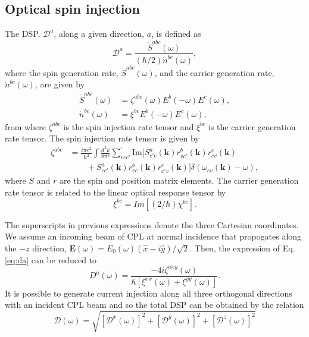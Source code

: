 \documentclass[pss]{wiley2sp} %
\begin{document}
\subsection{Optical spin injection}\label{sec:theory-DSP}

The DSP, $\mathcal{D}^{a}$, along a given direction, $a$, is defined as
\begin{equation}\label{eq:da}
\mathcal{D}^{a}=\frac{\dot{S}^{abc}(\omega)}{(\hbar/2)\dot{n}^{bc}(\omega)},
\end{equation}
where the spin generation rate, $\dot{S}^{abc}(\omega)$, and the carrier generation rate, $\dot{n}^{bc}(\omega)$,  are given by 
\begin{align*}
\dot{S}^{abc}(\omega) &= \zeta^{abc}(\omega)E^{b}(-\omega)E^{c}(\omega), \nonumber \\ 
\dot{n}^{bc}(\omega)  &= \xi^{bc}E^{b}(-\omega)E^{c}(\omega),
\end{align*}
from where $\zeta^{abc}$ is the spin injection rate tensor and $\xi^{bc}$ is the carrier generation rate tensor. The spin injection rate tensor is given by
\begin{align*}\label{eq:zeta}
\zeta^{abc} &= \frac{i\pi e^{2}}{\hbar^{2}}\int\frac{d^{3}k}{8\pi^{3}}
\sum_{vcc'}^{\prime}\text{Im}\bigl[S^{a}_{c'c}(\textbf{k})
r^{b}_{vc'}(\textbf{k})r^{c}_{cv}(\textbf{k})\nonumber\\
&\qquad+S^{a}_{cc'}(\textbf{k})
r^{b}_{vc}(\textbf{k})r^{c}_{c'v}(\textbf{k})\bigr]
\delta(\omega_{cv}(\textbf{k})-\omega),
\end{align*}
where $S$ and $r$ are the spin and position matrix elements. The carrier generation rate tensor is related to the linear optical response tensor by 
\begin{equation*}
\xi^{bc}=Im[(2/\hbar)\chi^{bc}].
\end{equation*}

The superscripts in previous expressions denote the three Cartesian coordinates. We assume an incoming beam of CPL at normal incidence that propogates along the $-z$ direction, $\mathbf{E}(\omega) = E_{0}(\omega)(\hat{x} - i\hat{y})/\sqrt{2}$. Then, the expression of Eq. \eqref{eq:da} can be reduced to
\begin{equation}\label{eq:D^i}
D^{a}(\omega) = 
\frac{-4i\zeta^{axy}(\omega)}
    {\hbar\left[\xi^{xx}(\omega) + \xi^{yy}(\omega)\right]}.
\end{equation}
It is possible to generate current injection along all three orthogonal directions with
an incident CPL beam and so the total DSP can be obtained by the relation
\begin{equation}\label{eq:dsptotal}
\mathcal{D}(\omega) = \sqrt{ [\mathcal{D}^{x}(\omega)]^{2} + [\mathcal{D}^{y}(\omega)]^{2} +[\mathcal{D}^{z}(\omega)]^{2}  }
\end{equation}
\end{document}
